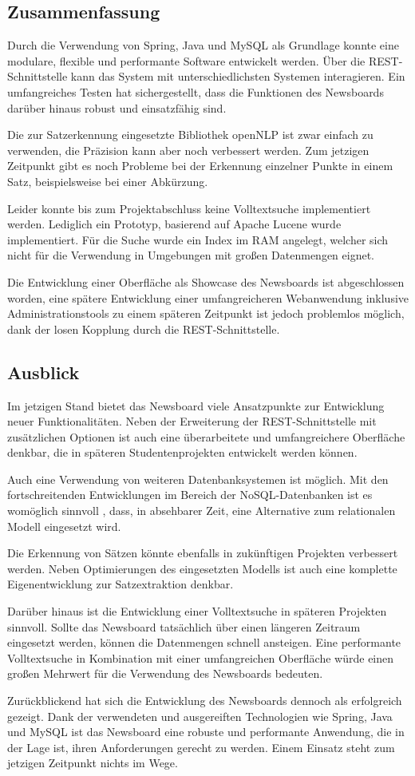\subsection{Zusammenfassung}
Durch die Verwendung von Spring, Java und MySQL als Grundlage konnte eine modulare, flexible
und performante Software entwickelt werden. Über die REST-Schnittstelle kann das System
mit unterschiedlichsten Systemen interagieren. Ein umfangreiches Testen hat sichergestellt,
dass die Funktionen des Newsboards darüber hinaus robust und einsatzfähig sind.

Die zur Satzerkennung eingesetzte Bibliothek openNLP ist zwar einfach zu
verwenden, die Präzision kann aber noch verbessert werden. Zum jetzigen Zeitpunkt gibt es 
noch Probleme bei der Erkennung einzelner Punkte in einem Satz, beispielsweise bei einer
Abkürzung.

Leider konnte bis zum Projektabschluss keine Volltextsuche implementiert werden. Lediglich
ein Prototyp, basierend auf Apache Lucene wurde implementiert. Für die Suche wurde ein Index
im RAM angelegt, welcher sich nicht für die Verwendung in Umgebungen mit großen Datenmengen
eignet.

Die Entwicklung einer Oberfläche als Showcase des Newsboards ist abgeschlossen worden, eine
spätere Entwicklung einer umfangreicheren Webanwendung inklusive Administrationstools zu
einem späteren Zeitpunkt ist jedoch problemlos möglich, dank der losen Kopplung durch die
REST-Schnittstelle.

\subsection{Ausblick} 
Im jetzigen Stand bietet das Newsboard viele Ansatzpunkte zur Entwicklung neuer 
Funktionalitäten. Neben der Erweiterung der REST-Schnittstelle mit zusätzlichen Optionen ist 
auch eine überarbeitete und umfangreichere Oberfläche denkbar, die in späteren 
Studentenprojekten entwickelt werden können.

Auch eine Verwendung von weiteren Datenbanksystemen ist möglich. Mit den fortschreitenden
Entwicklungen im Bereich der NoSQL-Datenbanken ist es womöglich sinnvoll , dass, in
absehbarer Zeit, eine Alternative zum relationalen Modell eingesetzt wird. 

Die Erkennung von Sätzen könnte ebenfalls in zukünftigen Projekten verbessert werden. Neben
Optimierungen des eingesetzten Modells ist auch eine komplette Eigenentwicklung zur
Satzextraktion denkbar.

Darüber hinaus ist die Entwicklung einer Volltextsuche in späteren Projekten sinnvoll. 
Sollte das Newsboard tatsächlich über einen längeren Zeitraum eingesetzt werden, 
können die Datenmengen schnell ansteigen. Eine performante Volltextsuche in Kombination mit 
einer umfangreichen Oberfläche würde einen großen Mehrwert für die Verwendung des Newsboards
bedeuten.

Zurückblickend hat sich die Entwicklung des Newsboards dennoch als erfolgreich gezeigt.
Dank der verwendeten und ausgereiften Technologien wie Spring, Java und MySQL ist das
Newsboard eine robuste und performante Anwendung, die in der Lage ist, ihren Anforderungen
gerecht zu werden. Einem Einsatz steht zum jetzigen Zeitpunkt nichts im Wege.